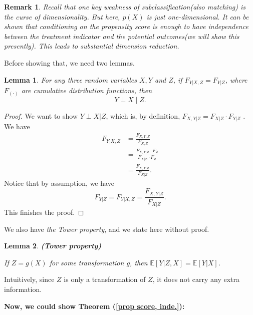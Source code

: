 \documentclass[11pt,a4paper]{amsart}
\theoremstyle{plain}
\newtheorem{lemma}{Lemma}
\newtheorem*{remark*}{Remark}
\theoremstyle{definition}
\begin{document}
	\begin{remark*}
		Recall that one key weakness of subclassification(also matching) is the curse of dimensionality. But here, $p(X)$ is just one-dimensional. It can be shown that conditioning on the propensity score is enough to have independence between the treatment indicator and the potential outcomes(we will show this presently). This leads to substantial dimension reduction. 
	\end{remark*}
	Before showing that, we need two lemmas.
	\begin{lemma}\label{perp- lemma, ppcsore}
		For any three random variables $X,Y$ and $Z$, if $F_{Y|X,Z} = F_{Y|Z}$, where $F_{(\cdot)}$ are cumulative distribution functions, then 
		\[	Y \perp X \mid  Z.	\]
	\end{lemma}
	\begin{proof}
		We want to show $Y \perp X | Z$, which is, by definition, $F_{X,Y|Z} = F_{X|Z} \cdot F_{Y|Z}$ . 
		We have 
		\[	\begin{aligned}
			F_{Y|X,Z} &= \frac{F_{X,Y,Z}}{F_{X,Z}} \\
			&=  \frac{F_{X,Y|Z}\cdot F_{Z}}{F_{X|Z} \cdot F_{Z}} \\
			&=  \frac{F_{X,Y|Z}}{F_{X|Z}}.
		\end{aligned}	\]
		Notice that by assumption, we have 
		\[  F_{Y|Z} = F_{Y|X,Z} = \frac{F_{X,Y|Z}}{F_{X|Z}}.	\]
		This finishes the proof.
	\end{proof}
	We also have \textit{the Tower property}, and we state here without proof.
	\begin{lemma}\label{tower}
		\textbf{(Tower property)} \par 
		If $Z=g(X)$ for some transformation $g$, then $\mathbb{E}[Y|Z,X] = \mathbb{E}[Y|X]$.
	\end{lemma}
	Intuitively, since $Z$ is only a transformation of $Z$, it does not carry any extra information.\par 
	\textbf{Now, we could show Theorem (\ref{prop score, inde.}):}
\end{document}

